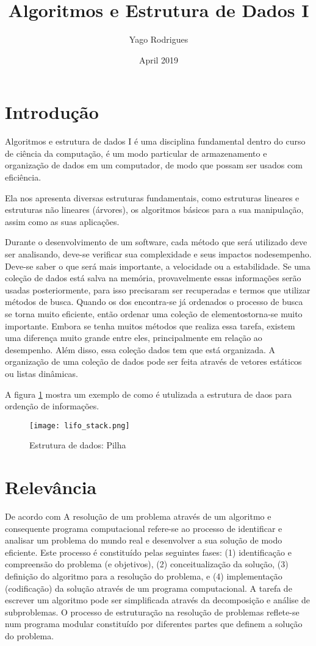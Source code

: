 \documentclass{article}
\title{Algoritmos e Estrutura de Dados I}
\author{Yago Rodrigues }
\date{April 2019}
\begin{document}
\maketitle
\newpage
\section{Introdução}
Algoritmos e estrutura de dados I é uma disciplina fundamental dentro do curso de ciência da computação, é um modo particular de armazenamento e organização de dados em um computador, de modo que possam ser usados com eficiência.

Ela nos apresenta diversas estruturas fundamentais, como estruturas lineares e estruturas não lineares (árvores), os   algoritmos   básicos   para   a   sua   manipulação,   assim   como   as   suas aplicações.

Durante o desenvolvimento de um software, cada método que será utilizado deve ser analisando, deve-se verificar sua complexidade e seus impactos nodesempenho. Deve-se saber o que será mais importante, a velocidade ou a estabilidade.
Se uma coleção de dados está salva na memória, provavelmente essas informações serão usadas posteriormente, para isso precisaram ser recuperadas e termos que utilizar métodos de busca.
Quando os dos encontra-se já ordenados o processo de busca se torna muito eficiente, então ordenar uma coleção de elementostorna-se muito importante. Embora se tenha muitos métodos que realiza essa tarefa, existem uma diferença muito grande entre eles, principalmente em relação ao desempenho. Além disso, essa coleção dados tem que está organizada.
A organização de uma coleção de dados pode ser feita através de vetores estáticos ou listas dinâmicas.

A figura \ref{imagem} mostra um exemplo de como é utulizada a estrutura de daos para ordenção de informações.
\begin{figure}[!htb]
     \centering
     \texttt{[image: lifo\_stack.png]}
     \caption{Estrutura de dados: Pilha}
     \label{imagem}
\end{figure}
\newpage
\section{Relevância}
De acordo com \cite{dsi} A  resolução  de  um  problema  através  de  um  algoritmo  e  consequente  programa computacional  refere-se  ao  processo  de  identificar  e  analisar  um  problema  do mundo  real  e  desenvolver  a  sua  solução  de  modo  eficiente.  Este  processo  é constituído pelas seguintes fases: (1) identificação e compreensão do problema (e objetivos),  (2)  conceitualização  da  solução,  (3)  definição  do  algoritmo  para  a resolução  do  problema,  e  (4)  implementação  (codificação)  da  solução  através  de um programa computacional. A tarefa de escrever um algoritmo pode ser simplificada através da decomposição e   análise   de   subproblemas.   O   processo   de   estruturação   na   resolução   de problemas reflete-se num programa modular constituído por diferentes partes que definem a solução do problema.
\newpage
\end{document}
